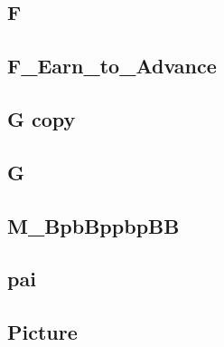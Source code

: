 \subsection{F}
\raggedbottom
\hrulefill
\subsection{F_Earn_to_Advance}
\raggedbottom
\hrulefill
\subsection{G copy}
\raggedbottom
\hrulefill
\subsection{G}
\raggedbottom
\hrulefill
\subsection{M_BpbBppbpBB}
\raggedbottom
\hrulefill
\subsection{pai}
\raggedbottom
\hrulefill
\subsection{Picture}
\raggedbottom
\hrulefill